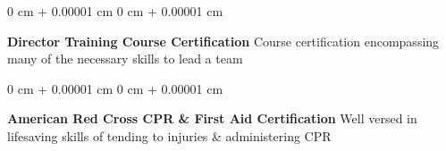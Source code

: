 \documentclass[10pt, letterpaper]{article}
\newenvironment{onecolentry}{
    \begin{adjustwidth}{
        0 cm + 0.00001 cm
    }{
        0 cm + 0.00001 cm
    }
}{
    \end{adjustwidth}
} %
\begin{document}
        \vspace{0.1 cm}

        \begin{onecolentry}
            \textbf{Director Training Course Certification} Course certification encompassing many of the necessary skills to lead a team
        \end{onecolentry}

        \vspace{0.1 cm}

        \begin{onecolentry}
            \textbf{American Red Cross CPR \& First Aid Certification} Well versed in lifesaving skills of tending to injuries \& administering CPR
        \end{onecolentry}
    
\end{document}
